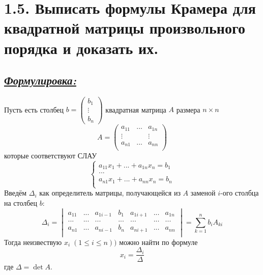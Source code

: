 \documentclass{article}
\begin{document}
\section*{\LARGE 1.5. Выписать формулы Крамера для квадратной матрицы произвольного порядка и доказать их.}
\subsection*{\Large \underline{\textit{Формулировка: }}}
Пусть есть столбец $b = \begin{pmatrix} b_1 \\ \vdots \\ b_n \end{pmatrix}$ квадратная матрица $A$ размера $n \times n$
$$
A = 
\begin{pmatrix}
a_{11} & ... & a_{1n} \\
\vdots &  & \vdots \\
a_{n1} & ... & a_{nn} \\
\end{pmatrix}
$$
которые соответствуют СЛАУ
$$
\begin{cases}
a_{11}x_1 + ... + a_{1n}x_n = b_1 \\
... \\
a_{n1}x_1 + ... + a_{nn}x_n = b_n \\
\end{cases}
$$
Введём $\Delta_i$ как определитель матрицы, получающейся из $A$ заменой $i$-ого столбца на столбец $b$:
$$
\Delta_i = 
\begin{vmatrix}
a_{11} & ... & a_{1i-1} & b_1 & a_{1i+1} & ... & a_{1n} \\
... & ... & ... & ... & ... & ... & ... \\
a_{n1} & ... & a_{ni-1} & b_n & a_{ni+1} & ... & a_{nn} \\
\end{vmatrix} = 
\sum_{k = 1}^{n}b_iA_{ki}
$$
Тогда неизвествую $x_i \; (1 \le i \le n))$ можно найти по формуле
$$
x_i = \frac{\Delta_i}{\Delta}
$$
где $\Delta = \det{A}$.
\end{document}
